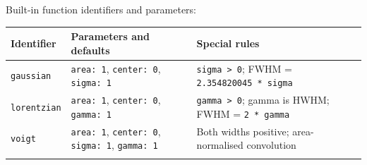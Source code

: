 \documentclass[
  10pt,
  a4paper,
  oneside]{scrreprt}
\begin{document}
Built-in function identifiers and parameters:

\begin{longtable}[]{@{}lll@{}}
\toprule
\begin{minipage}[b]{0.30\columnwidth}\raggedright
Identifier\strut
\end{minipage} & \begin{minipage}[b]{0.30\columnwidth}\raggedright
Parameters and defaults\strut
\end{minipage} & \begin{minipage}[b]{0.30\columnwidth}\raggedright
Special rules\strut
\end{minipage}\tabularnewline
\midrule
\endhead
\begin{minipage}[t]{0.30\columnwidth}\raggedright
\texttt{gaussian}\strut
\end{minipage} & \begin{minipage}[t]{0.30\columnwidth}\raggedright
\texttt{area:\ 1}, \texttt{center:\ 0}, \texttt{sigma:\ 1}\strut
\end{minipage} & \begin{minipage}[t]{0.30\columnwidth}\raggedright
\texttt{sigma\ \textgreater{}\ 0}; FWHM =
\texttt{2.354820045\ *\ sigma}\strut
\end{minipage}\tabularnewline
\begin{minipage}[t]{0.30\columnwidth}\raggedright
\texttt{lorentzian}\strut
\end{minipage} & \begin{minipage}[t]{0.30\columnwidth}\raggedright
\texttt{area:\ 1}, \texttt{center:\ 0}, \texttt{gamma:\ 1}\strut
\end{minipage} & \begin{minipage}[t]{0.30\columnwidth}\raggedright
\texttt{gamma\ \textgreater{}\ 0}; gamma is HWHM; FWHM =
\texttt{2\ *\ gamma}\strut
\end{minipage}\tabularnewline
\begin{minipage}[t]{0.30\columnwidth}\raggedright
\texttt{voigt}\strut
\end{minipage} & \begin{minipage}[t]{0.30\columnwidth}\raggedright
\texttt{area:\ 1}, \texttt{center:\ 0}, \texttt{sigma:\ 1},
\texttt{gamma:\ 1}\strut
\end{minipage} & \begin{minipage}[t]{0.30\columnwidth}\raggedright
Both widths positive; area-normalised convolution\strut
\end{minipage}\tabularnewline
\begin{minipage}[t]{0.30\columnwidth}\raggedright

\end{minipage}
\end{longtable}
\end{document}
